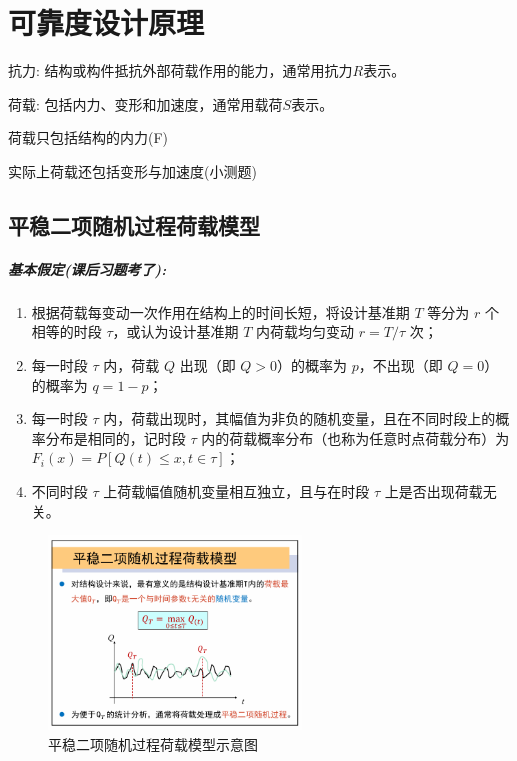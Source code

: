 \documentclass[12pt, a4paper, oneside, UTF8]{ctexbook}
\begin{document}
% 
\else
\fi

\chapter{可靠度设计原理}

\begin{definition}
    抗力: 结构或构件抵抗外部荷载作用的能力，通常用抗力$R$表示。

    荷载: 包括内力、变形和加速度，通常用载荷$S$表示。
\end{definition}

\begin{example}
    荷载只包括结构的内力(F)

    实际上荷载还包括变形与加速度(小测题)
\end{example}

\section{平稳二项随机过程荷载模型}

\paragraph{基本假定(课后习题考了):}

\begin{enumerate}
    \item 根据荷载每变动一次作用在结构上的时间长短，将设计基准期 \( T \) 等分为 \( r \) 个相等的时段 \( \tau \)，或认为设计基准期 \( T \) 内荷载均匀变动 \( r = T / \tau \) 次；

    \item 每一时段 \( \tau \) 内，荷载 \( Q \) 出现（即 \( Q > 0 \)）的概率为 \( p \)，不出现（即 \( Q = 0 \)）的概率为 \( q = 1 - p \)；

    \item 每一时段 \( \tau \) 内，荷载出现时，其幅值为非负的随机变量，且在不同时段上的概率分布是相同的，记时段 \( \tau \) 内的荷载概率分布（也称为任意时点荷载分布）为 \( F_i(x) = P[Q(t) \leq x, t \in \tau] \)；

    \item 不同时段 \( \tau \) 上荷载幅值随机变量相互独立，且与在时段 \( \tau \) 上是否出现荷载无关。
\end{enumerate}

\begin{figure}[H]
    \centering
    \includegraphics[width=0.6\textwidth]{../figure/pwex.png}
    \caption{平稳二项随机过程荷载模型示意图}
    \label{fig:chap5:fig1}
\end{figure}
\end{document}
